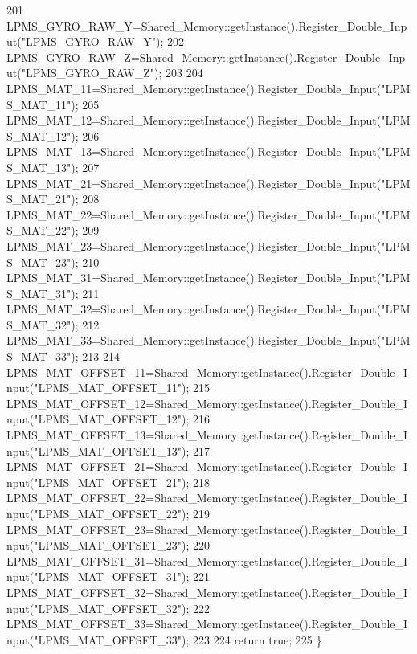 \begin{DoxyCode}
201     LPMS\_GYRO\_RAW\_Y=Shared\_Memory::getInstance().Register\_Double\_Input(\textcolor{stringliteral}{"LPMS\_GYRO\_RAW\_Y"});
202     LPMS\_GYRO\_RAW\_Z=Shared\_Memory::getInstance().Register\_Double\_Input(\textcolor{stringliteral}{"LPMS\_GYRO\_RAW\_Z"});
203 
204     LPMS\_MAT\_11=Shared\_Memory::getInstance().Register\_Double\_Input(\textcolor{stringliteral}{"LPMS\_MAT\_11"});
205     LPMS\_MAT\_12=Shared\_Memory::getInstance().Register\_Double\_Input(\textcolor{stringliteral}{"LPMS\_MAT\_12"});
206     LPMS\_MAT\_13=Shared\_Memory::getInstance().Register\_Double\_Input(\textcolor{stringliteral}{"LPMS\_MAT\_13"});
207     LPMS\_MAT\_21=Shared\_Memory::getInstance().Register\_Double\_Input(\textcolor{stringliteral}{"LPMS\_MAT\_21"});
208     LPMS\_MAT\_22=Shared\_Memory::getInstance().Register\_Double\_Input(\textcolor{stringliteral}{"LPMS\_MAT\_22"});
209     LPMS\_MAT\_23=Shared\_Memory::getInstance().Register\_Double\_Input(\textcolor{stringliteral}{"LPMS\_MAT\_23"});
210     LPMS\_MAT\_31=Shared\_Memory::getInstance().Register\_Double\_Input(\textcolor{stringliteral}{"LPMS\_MAT\_31"});
211     LPMS\_MAT\_32=Shared\_Memory::getInstance().Register\_Double\_Input(\textcolor{stringliteral}{"LPMS\_MAT\_32"});
212     LPMS\_MAT\_33=Shared\_Memory::getInstance().Register\_Double\_Input(\textcolor{stringliteral}{"LPMS\_MAT\_33"});
213 
214     LPMS\_MAT\_OFFSET\_11=Shared\_Memory::getInstance().Register\_Double\_Input(\textcolor{stringliteral}{"LPMS\_MAT\_OFFSET\_11"});
215     LPMS\_MAT\_OFFSET\_12=Shared\_Memory::getInstance().Register\_Double\_Input(\textcolor{stringliteral}{"LPMS\_MAT\_OFFSET\_12"});
216     LPMS\_MAT\_OFFSET\_13=Shared\_Memory::getInstance().Register\_Double\_Input(\textcolor{stringliteral}{"LPMS\_MAT\_OFFSET\_13"});
217     LPMS\_MAT\_OFFSET\_21=Shared\_Memory::getInstance().Register\_Double\_Input(\textcolor{stringliteral}{"LPMS\_MAT\_OFFSET\_21"});
218     LPMS\_MAT\_OFFSET\_22=Shared\_Memory::getInstance().Register\_Double\_Input(\textcolor{stringliteral}{"LPMS\_MAT\_OFFSET\_22"});
219     LPMS\_MAT\_OFFSET\_23=Shared\_Memory::getInstance().Register\_Double\_Input(\textcolor{stringliteral}{"LPMS\_MAT\_OFFSET\_23"});
220     LPMS\_MAT\_OFFSET\_31=Shared\_Memory::getInstance().Register\_Double\_Input(\textcolor{stringliteral}{"LPMS\_MAT\_OFFSET\_31"});
221     LPMS\_MAT\_OFFSET\_32=Shared\_Memory::getInstance().Register\_Double\_Input(\textcolor{stringliteral}{"LPMS\_MAT\_OFFSET\_32"});
222     LPMS\_MAT\_OFFSET\_33=Shared\_Memory::getInstance().Register\_Double\_Input(\textcolor{stringliteral}{"LPMS\_MAT\_OFFSET\_33"});
223 
224     \textcolor{keywordflow}{return} \textcolor{keyword}{true};
225 \}
\end{DoxyCode}
\mbox{\label{class_file___writer_a7450494cfffa8ba1635f9121dfd955de}} 
